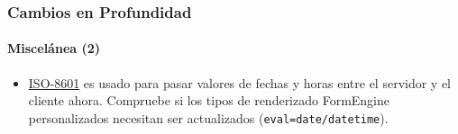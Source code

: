 \begin{frame}[fragile]
	\frametitle{Cambios en Profundidad}
	\framesubtitle{Miscelánea (2)}


	\begin{itemize}
		\item \href{https://en.wikipedia.org/wiki/ISO_8601}{ISO-8601} es usado para pasar valores de fechas y horas
			entre el servidor y el cliente ahora. Compruebe si los tipos de renderizado FormEngine personalizados necesitan
			ser actualizados (\texttt{eval=date/datetime}).

	\end{itemize}

\end{frame}





